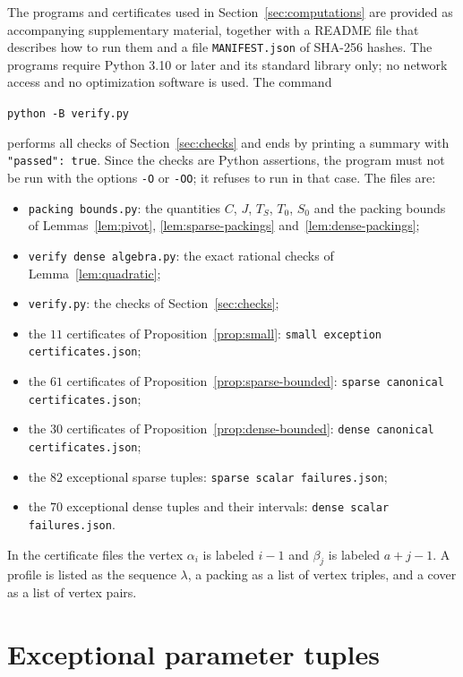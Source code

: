 \documentclass{amsart}
\theoremstyle{definition}
\numberwithin{equation}{section}
\numberwithin{table}{section}
\begin{document}
The programs and certificates used in Section~\ref{sec:computations} are provided as accompanying supplementary material, together with a README file that describes how to run them and a file \texttt{MANIFEST.json} of SHA-256 hashes. The programs require Python 3.10 or later and its standard library only; no network access and no optimization software is used. The command
\begin{center}
\texttt{python -B verify.py}
\end{center}
performs all checks of Section~\ref{sec:checks} and ends by printing a summary with \texttt{"passed": true}. Since the checks are Python assertions, the program must not be run with the options \texttt{-O} or \texttt{-OO}; it refuses to run in that case. The files are:
\par\begingroup\raggedright
\begin{itemize}
\item \texttt{packing bounds.py}: the quantities $C$, $J$, $T_S$, $T_0$, $S_0$ and the packing bounds of Lemmas~\ref{lem:pivot}, \ref{lem:sparse-packings} and~\ref{lem:dense-packings};
\item \texttt{verify dense algebra.py}: the exact rational checks of Lemma~\ref{lem:quadratic};
\item \texttt{verify.py}: the checks of Section~\ref{sec:checks};
\item the $11$ certificates of Proposition~\ref{prop:small}: \texttt{small exception certificates.json};
\item the $61$ certificates of Proposition~\ref{prop:sparse-bounded}: \texttt{sparse canonical certificates.json};
\item the $30$ certificates of Proposition~\ref{prop:dense-bounded}: \texttt{dense canonical certificates.json};
\item the $82$ exceptional sparse tuples: \texttt{sparse scalar failures.json};
\item the $70$ exceptional dense tuples and their intervals: \texttt{dense scalar failures.json}.
\end{itemize}
\par\endgroup
In the certificate files the vertex $\alpha_i$ is labeled $i-1$ and $\beta_j$ is labeled $a+j-1$. A profile is listed as the sequence $\lambda$, a packing as a list of vertex triples, and a cover as a list of vertex pairs.

\section{Exceptional parameter tuples}\label{app:tables}
\end{document}
